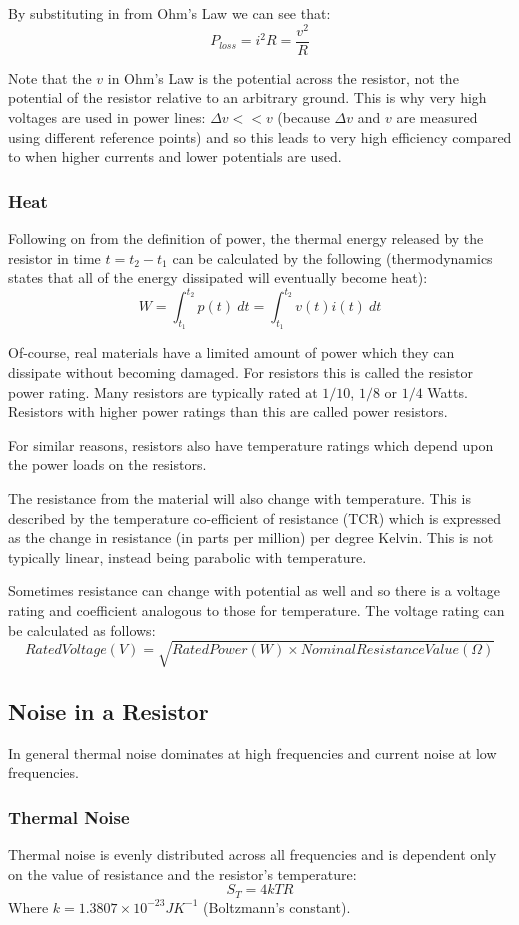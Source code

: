 \documentclass[11pt,a4paper]{report}
\begin{document}
By substituting in from Ohm's Law we can see that:
\[P_{loss} = i^2R = \frac{v^2}{R}\]

Note that the $v$ in Ohm's Law is the potential across the resistor, not the potential of the resistor relative to an arbitrary ground. This is why very high voltages are used in power lines: $\Delta v << v$ (because $\Delta v$ and $v$ are measured using different reference points) and so this leads to very high efficiency compared to when higher currents and lower potentials are used.

\subsubsection{Heat}
Following on from the definition of power, the thermal energy released by the resistor in time $t = t_2 - t_1$ can be calculated by the following (thermodynamics states that all of the energy dissipated will eventually become heat):
\[W=\int_{t_1}^{t_2} p(t) \: dt = \int_{t_1}^{t_2} v(t)i(t) \: dt\]

Of-course, real materials have a limited amount of power which they can dissipate without becoming damaged. For resistors this is called the resistor power rating. Many resistors are typically rated at $1/10$, $1/8$ or $1/4$ Watts. Resistors with higher power ratings than this are called power resistors.

For similar reasons, resistors also have temperature ratings which depend upon the power loads on the resistors.

The resistance from the material will also change with temperature. This is described by the temperature co-efficient of resistance (TCR) which is expressed as the change in resistance (in parts per million) per degree Kelvin. This is not typically linear, instead being parabolic with temperature.

Sometimes resistance can change with potential as well and so there is a voltage rating and coefficient analogous to those for temperature. The voltage rating can be calculated as follows:
\[Rated Voltage(V)=\sqrt{Rated Power(W) \times Nominal Resistance Value(\Omega)}\]

\subsection{Noise in a Resistor}
In general thermal noise dominates at high frequencies and current noise at low frequencies.
\subsubsection{Thermal Noise}
Thermal noise is evenly distributed across all frequencies and is dependent only on the value of resistance and the resistor's temperature:
\[S_T = 4kTR\]
Where $k = 1.3807 \times 10^{-23} JK^{-1}$ (Boltzmann's constant). 
\end{document}
